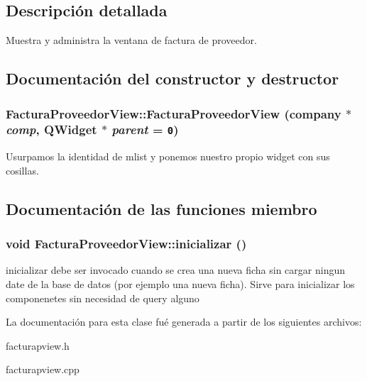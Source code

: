 \subsection{Descripci\'{o}n detallada}
Muestra y administra la ventana de factura de proveedor. 



\subsection{Documentaci\'{o}n del constructor y destructor}
\subsubsection{\setlength{\rightskip}{0pt plus 5cm}Factura\-Proveedor\-View::Factura\-Proveedor\-View ({\bf company} $\ast$ {\em comp}, QWidget $\ast$ {\em parent} = {\tt 0})}\label{classFacturaProveedorView_a2}


Usurpamos la identidad de mlist y ponemos nuestro propio widget con sus cosillas. 

\subsection{Documentaci\'{o}n de las funciones miembro}
\subsubsection{\setlength{\rightskip}{0pt plus 5cm}void Factura\-Proveedor\-View::inicializar ()}\label{classFacturaProveedorView_a4}


inicializar debe ser invocado cuando se crea una nueva ficha sin cargar ningun date de la base de datos (por ejemplo una nueva ficha). Sirve para inicializar los componenetes sin necesidad de query alguno 

La documentaci\'{o}n para esta clase fu\'{e} generada a partir de los siguientes archivos:\begin{CompactItemize}
\item 
facturapview.h\item 
facturapview.cpp\end{CompactItemize}
